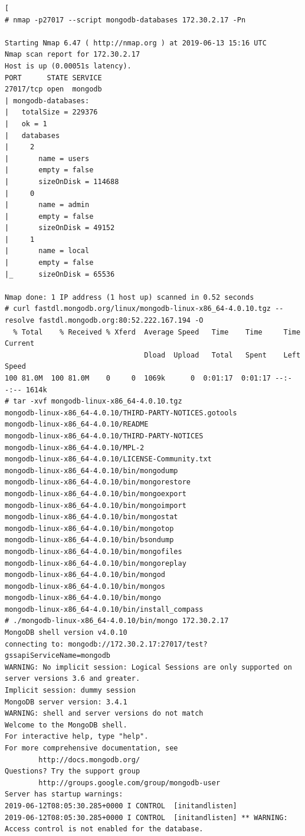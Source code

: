 \begin{lstlisting}[
# nmap -p27017 --script mongodb-databases 172.30.2.17 -Pn

Starting Nmap 6.47 ( http://nmap.org ) at 2019-06-13 15:16 UTC
Nmap scan report for 172.30.2.17
Host is up (0.00051s latency).
PORT      STATE SERVICE
27017/tcp open  mongodb
| mongodb-databases:
|   totalSize = 229376
|   ok = 1
|   databases
|     2
|       name = users
|       empty = false
|       sizeOnDisk = 114688
|     0
|       name = admin
|       empty = false
|       sizeOnDisk = 49152
|     1
|       name = local
|       empty = false
|_      sizeOnDisk = 65536

Nmap done: 1 IP address (1 host up) scanned in 0.52 seconds
# curl fastdl.mongodb.org/linux/mongodb-linux-x86_64-4.0.10.tgz --resolve fastdl.mongodb.org:80:52.222.167.194 -O
  % Total    % Received % Xferd  Average Speed   Time    Time     Time  Current
                                 Dload  Upload   Total   Spent    Left  Speed
100 81.0M  100 81.0M    0     0  1069k      0  0:01:17  0:01:17 --:--:-- 1614k
# tar -xvf mongodb-linux-x86_64-4.0.10.tgz
mongodb-linux-x86_64-4.0.10/THIRD-PARTY-NOTICES.gotools
mongodb-linux-x86_64-4.0.10/README
mongodb-linux-x86_64-4.0.10/THIRD-PARTY-NOTICES
mongodb-linux-x86_64-4.0.10/MPL-2
mongodb-linux-x86_64-4.0.10/LICENSE-Community.txt
mongodb-linux-x86_64-4.0.10/bin/mongodump
mongodb-linux-x86_64-4.0.10/bin/mongorestore
mongodb-linux-x86_64-4.0.10/bin/mongoexport
mongodb-linux-x86_64-4.0.10/bin/mongoimport
mongodb-linux-x86_64-4.0.10/bin/mongostat
mongodb-linux-x86_64-4.0.10/bin/mongotop
mongodb-linux-x86_64-4.0.10/bin/bsondump
mongodb-linux-x86_64-4.0.10/bin/mongofiles
mongodb-linux-x86_64-4.0.10/bin/mongoreplay
mongodb-linux-x86_64-4.0.10/bin/mongod
mongodb-linux-x86_64-4.0.10/bin/mongos
mongodb-linux-x86_64-4.0.10/bin/mongo
mongodb-linux-x86_64-4.0.10/bin/install_compass
# ./mongodb-linux-x86_64-4.0.10/bin/mongo 172.30.2.17
MongoDB shell version v4.0.10
connecting to: mongodb://172.30.2.17:27017/test?gssapiServiceName=mongodb
WARNING: No implicit session: Logical Sessions are only supported on server versions 3.6 and greater.
Implicit session: dummy session
MongoDB server version: 3.4.1
WARNING: shell and server versions do not match
Welcome to the MongoDB shell.
For interactive help, type "help".
For more comprehensive documentation, see
        http://docs.mongodb.org/
Questions? Try the support group
        http://groups.google.com/group/mongodb-user
Server has startup warnings:
2019-06-12T08:05:30.285+0000 I CONTROL  [initandlisten]
2019-06-12T08:05:30.285+0000 I CONTROL  [initandlisten] ** WARNING: Access control is not enabled for the database.

\end{lstlisting}
